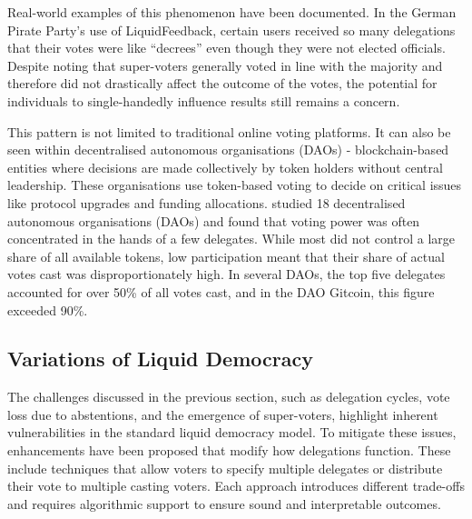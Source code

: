 Real-world examples of this phenomenon have been documented. In the German Pirate Party's use of LiquidFeedback, certain users received so many delegations that their votes were like ``decrees'' \citep{sven_becker_liquid_2012,kling2015votingbehaviourpoweronline} even though they were not elected officials.
Despite \cite{kling2015votingbehaviourpoweronline} noting that super-voters generally voted in line with the majority and therefore did not drastically affect the outcome of the votes, the potential for individuals to single-handedly influence results still remains a concern.

This pattern is not limited to traditional online voting platforms. It can also be seen within decentralised autonomous organisations (DAOs) - blockchain-based entities where decisions are made collectively by token holders without central leadership. These organisations use token-based voting to decide on critical issues like protocol upgrades and funding allocations. \cite{hallWhatHappensWhen2024} studied 18 decentralised autonomous organisations (DAOs) and found that voting power was often concentrated in the hands of a few delegates. While most did not control a large share of all available tokens, low participation meant that their share of actual votes cast was disproportionately high. In several DAOs, the top five delegates accounted for over 50\% of all votes cast, and in the DAO Gitcoin, this figure exceeded 90\%.

\subsection{Variations of Liquid Democracy}
The challenges discussed in the previous section, such as delegation cycles, vote loss due to abstentions, and the emergence of super-voters, highlight inherent vulnerabilities in the standard liquid democracy model. To mitigate these issues, enhancements have been proposed that modify how delegations function. These include techniques that allow voters to specify multiple delegates or distribute their vote to multiple casting voters. Each approach introduces different trade-offs and requires algorithmic support to ensure sound and interpretable outcomes.

